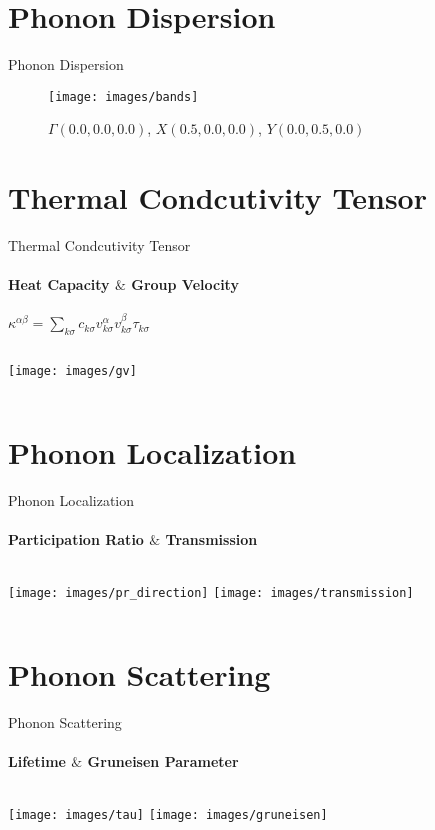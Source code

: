 \documentclass{beamer}
\begin{document}
\section{Phonon Dispersion}
\begin{frame}{Phonon Dispersion}
  \begin{figure}[b]
    \texttt{[image: images/bands]}
    \caption{\label{fig:bands} $\Gamma(0.0, 0.0, 0.0)$, $X(0.5, 0.0, 0.0)$,  $Y(0.0, 0.5, 0.0)$}
  \end{figure}
\end{frame}

\section{Thermal Condcutivity Tensor}
\begin{frame}{Thermal Condcutivity Tensor}
  \framesubtitle{Heat Capacity $\&$ Group Velocity}%
  $\kappa^{\alpha\beta} = \sum_{k \sigma}{c_{k \sigma}v^{\alpha}_{k \sigma}v^{\beta}_{k \sigma}\tau_{k \sigma}}$

  \begin{columns}[onlytextwidth]
    \texttt{[image: images/gv]}
  \end{columns}
\end{frame}

\section{Phonon Localization}
\begin{frame}{Phonon Localization}
  \framesubtitle{Participation Ratio $\&$ Transmission}%
  \begin{columns}[onlytextwidth]
    \texttt{[image: images/pr\_direction]}
    \texttt{[image: images/transmission]}
  \end{columns}
\end{frame}

\section{Phonon Scattering}
\begin{frame}{Phonon Scattering}
  \framesubtitle{Lifetime $\&$ Gruneisen Parameter}%
  \begin{columns}[onlytextwidth]
    \texttt{[image: images/tau]}
    \texttt{[image: images/gruneisen]}
  \end{columns}
\end{frame}
\end{document}

